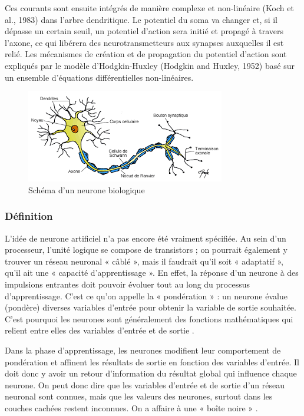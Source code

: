 \documentclass[12pt]{article}
\begin{document}
Ces courants sont ensuite intégrés de manière complexe et non-linéaire (Koch et al., 1983) dans l’arbre dendritique. Le potentiel du soma va changer et, si il dépasse un certain seuil, un potentiel d’action sera initié et propagé à travers l’axone, ce qui libérera des neurotransmetteurs aux synapses auxquelles il est relié. Les mécanismes de création et de propagation du potentiel d’action sont expliqués par le modèle d’Hodgkin-Huxley (Hodgkin and Huxley, 1952) basé sur un ensemble d’équations différentielles non-linéaires.
\begin{figure}[h]
\centering
\includegraphics[scale=1]{img-Chapiter-1/neurone.png}
\caption{Schéma d’un neurone biologique}
\end{figure}
\subsubsection{Définition}
L'idée de neurone artificiel n’a pas encore été vraiment spécifiée. Au sein d'un processeur, l’unité logique se compose de transistors ; on pourrait également y trouver un réseau neuronal « câblé », mais il faudrait qu’il soit « adaptatif », qu’il ait une « capacité d'apprentissage ». En effet, la réponse d'un neurone à des impulsions entrantes doit pouvoir évoluer tout au long du processus d'apprentissage. C'est ce qu'on appelle la « pondération » : un neurone évalue (pondère) diverses variables d'entrée pour obtenir la variable de sortie souhaitée. C'est pourquoi les neurones sont généralement des fonctions mathématiques qui relient entre elles des variables d'entrée et de sortie \cite{10}.

Dans la phase d'apprentissage, les neurones modifient leur comportement de pondération et affinent les résultats de sortie en fonction des variables d'entrée. Il doit donc y avoir un retour d'information du résultat global qui influence chaque neurone. On peut donc dire que les variables d'entrée et de sortie d'un réseau neuronal sont connues, mais que les valeurs des neurones, surtout dans les couches cachées restent inconnues. On a affaire à une « boîte noire » \cite{10}.
\end{document}

